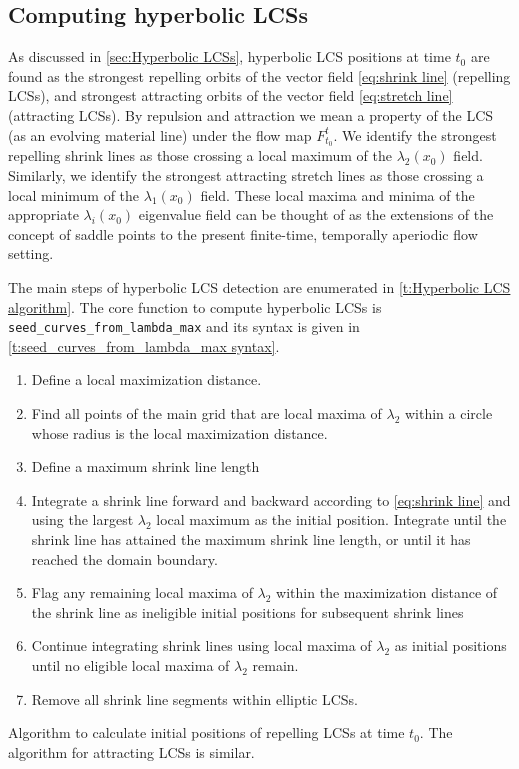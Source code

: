 \documentclass[5p]{elsarticle}
\begin{document}
\subsection{Computing hyperbolic LCSs}

As discussed in \cref{sec:Hyperbolic LCSs}, hyperbolic LCS positions at time $t_0$ are found as the strongest repelling orbits of the vector field \cref{eq:shrink line} (repelling LCSs), and strongest attracting orbits of the vector field \cref{eq:stretch line} (attracting LCSs).
By repulsion and attraction we mean a property of the LCS (as an evolving material line) under the flow map $F_{t_0}^t$.
We identify the strongest repelling shrink lines as those crossing a local maximum of the $\lambda_2(x_0)$ field.
Similarly, we identify the strongest attracting stretch lines as those crossing a local minimum of the $\lambda_1(x_0)$ field.
These local maxima and minima of the appropriate $\lambda_i(x_0)$ eigenvalue field can be thought of as the extensions of the concept of saddle points to the present finite-time, temporally aperiodic flow setting.

The main steps of hyperbolic LCS detection are enumerated in \cref{t:Hyperbolic LCS algorithm}.
The core function to compute hyperbolic LCSs is \lstinline!seed_curves_from_lambda_max! and its syntax is given in \cref{t:seed_curves_from_lambda_max syntax}.

\begin{table}
\begin{enumerate}
\item Define a local maximization distance.
\item Find all points of the main grid that are local maxima of $\lambda_2$ within a circle whose radius is the local  maximization distance.
\item Define a maximum shrink line length
\item Integrate a shrink line forward and backward according to \cref{eq:shrink line} and using the largest $\lambda_2$ local maximum as the initial position. Integrate until the shrink line has attained the maximum shrink line length, or until it has reached the domain boundary.
\item Flag any remaining local maxima of $\lambda_2$ within the maximization distance of the shrink line as ineligible initial positions for subsequent shrink lines
\label{i:flag maxima}
\item Continue integrating shrink lines using local maxima of $\lambda_2$ as initial positions until no eligible local maxima of $\lambda_2$ remain.
\item Remove all shrink line segments within elliptic LCSs.
\end{enumerate}
\caption{Algorithm to calculate initial positions of repelling LCSs at time $t_0$. The algorithm for attracting LCSs is similar.}
\label{t:Hyperbolic LCS algorithm}
\end{table}
\end{document}
